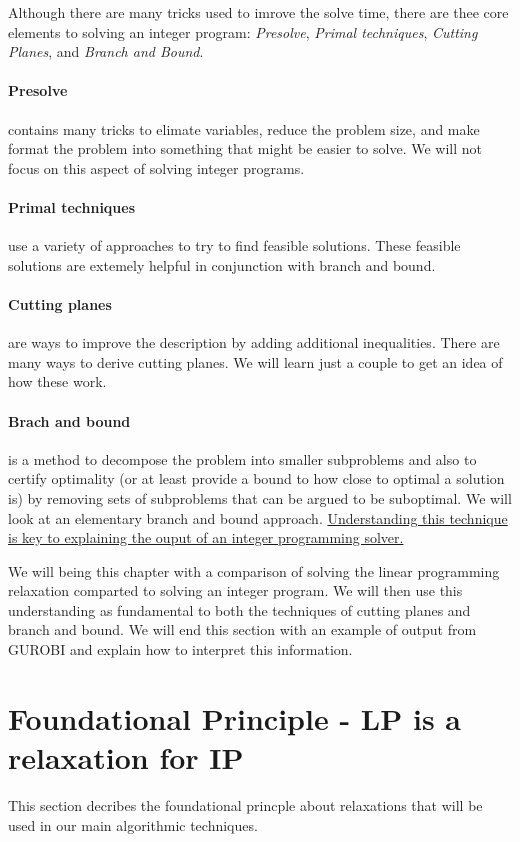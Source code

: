 Although there are many tricks used to imrove the solve time, there are thee core elements to solving an integer program: \emph{Presolve}, \emph{Primal techniques}, \emph{Cutting Planes}, and \emph{Branch and Bound}.   

\paragraph{Presolve} contains many tricks to elimate variables, reduce the problem size, and make format the problem into something that might be easier to solve.  We will not focus on this aspect of solving integer programs.

\paragraph{Primal techniques} use a variety of approaches to try to find feasible solutions.  These feasible solutions are extemely helpful in conjunction with branch and bound.

\paragraph{Cutting planes} are ways to improve the description by adding additional inequalities.  There are many ways to derive cutting planes.  We will learn just a couple to get an idea of how these work.  

\paragraph{Brach and bound} is a method to decompose the problem into smaller subproblems and also to certify optimality (or at least provide a bound to how close to optimal a solution is) by removing sets of subproblems that can be argued to be suboptimal.   We will look at an elementary branch and bound approach.  \underline{Understanding this technique is key to explaining the ouput of an integer programming solver.}

We will being this chapter with a comparison of solving the linear programming relaxation comparted to solving an integer program.  We will then use this understanding as fundamental to both the techniques of cutting planes and branch and bound.
We will end this section with an example of output from GUROBI and explain how to interpret this information.

\section{Foundational Principle - LP is a relaxation for IP}
\label{sec:lp-relaxation-ip}
\begin{outcome}
This section decribes the foundational princple about relaxations that will be used in our main algorithmic techniques.
\end{outcome}

